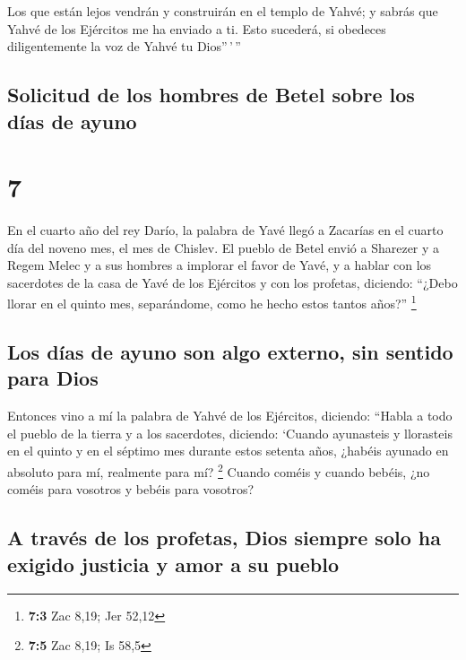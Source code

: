  Los que están lejos vendrán y construirán en el templo
de Yahvé; y sabrás que Yahvé de los Ejércitos me ha enviado a ti. Esto
sucederá, si obedeces diligentemente la voz de Yahvé tu Dios''\,'\,''

\hypertarget{solicitud-de-los-hombres-de-betel-sobre-los-duxedas-de-ayuno}{%
\subsection{Solicitud de los hombres de Betel sobre los días de
ayuno}\label{solicitud-de-los-hombres-de-betel-sobre-los-duxedas-de-ayuno}}

\hypertarget{section-6}{%
\section{7}\label{section-6}}

 En el cuarto año del rey Darío, la palabra de Yavé llegó
a Zacarías en el cuarto día del noveno mes, el mes de Chislev.
 El pueblo de Betel envió a Sharezer y a Regem Melec y a
sus hombres a implorar el favor de Yavé,  y a hablar con
los sacerdotes de la casa de Yavé de los Ejércitos y con los profetas,
diciendo: ``¿Debo llorar en el quinto mes, separándome, como he hecho
estos tantos años?'' \footnote{\textbf{7:3} Zac 8,19; Jer 52,12}

\hypertarget{los-duxedas-de-ayuno-son-algo-externo-sin-sentido-para-dios}{%
\subsection{Los días de ayuno son algo externo, sin sentido para
Dios}\label{los-duxedas-de-ayuno-son-algo-externo-sin-sentido-para-dios}}

 Entonces vino a mí la palabra de Yahvé de los Ejércitos,
diciendo:  ``Habla a todo el pueblo de la tierra y a los
sacerdotes, diciendo: `Cuando ayunasteis y llorasteis en el quinto y en
el séptimo mes durante estos setenta años, ¿habéis ayunado en absoluto
para mí, realmente para mí? \footnote{\textbf{7:5} Zac 8,19; Is 58,5}
 Cuando coméis y cuando bebéis, ¿no coméis para vosotros y
bebéis para vosotros?

\hypertarget{a-travuxe9s-de-los-profetas-dios-siempre-solo-ha-exigido-justicia-y-amor-a-su-pueblo}{%
\subsection{A través de los profetas, Dios siempre solo ha exigido
justicia y amor a su
pueblo}\label{a-travuxe9s-de-los-profetas-dios-siempre-solo-ha-exigido-justicia-y-amor-a-su-pueblo}}

